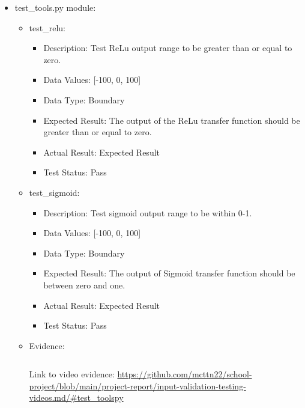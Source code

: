 \documentclass[./project-report/src/latex/project-report.tex]{subfiles}
\begin{document}
\begin{itemize}
\begin{itemize}
\begin{itemize}
				\end{itemize}
            \item test\_tools.py module:
				\begin{itemize}
					\item test\_relu:
					\begin{itemize}
						\item Description: Test ReLu output range to be greater than or equal to zero.
						\item Data Values: [-100, 0, 100]
						\item Data Type: Boundary
						\item Expected Result: The output of the ReLu transfer function should be greater than or equal to zero.
						\item Actual Result: Expected Result
						\item Test Status: Pass
					\end{itemize}
					\item test\_sigmoid:
					\begin{itemize}
						\item Description: Test sigmoid output range to be within 0-1.
						\item Data Values: [-100, 0, 100]
						\item Data Type: Boundary
						\item Expected Result: The output of Sigmoid transfer function should be between zero and one.
						\item Actual Result: Expected Result
						\item Test Status: Pass
					\end{itemize}
					\item Evidence:
                		\inputminted{python}{./school_project/test/models/cpu/utils/test_tools.py}
						\begin{figure}[h!]
						\centering
						\end{figure}
	
						Link to video evidence: \url{https://github.com/mcttn22/school-project/blob/main/project-report/input-validation-testing-videos.md/#test_toolspy}
				\end{itemize}
        \end{itemize}
\end{itemize}
\end{document}
